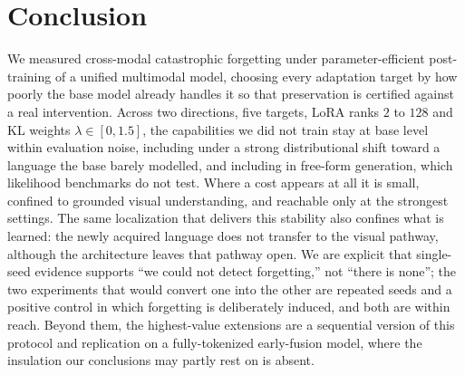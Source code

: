\documentclass{article}
\begin{document}
\section{Conclusion}
We measured cross-modal catastrophic forgetting under parameter-efficient
post-training of a unified multimodal model, choosing every adaptation target by
how poorly the base model already handles it so that preservation is certified
against a real intervention. Across two directions, five targets, LoRA ranks $2$
to $128$ and KL weights $\lambda\in[0,1.5]$, the capabilities we did not train
stay at base level within evaluation noise, including under a strong
distributional shift toward a language the base barely modelled, and including in
free-form generation, which likelihood benchmarks do not test. Where a cost
appears at all it is small, confined to grounded visual understanding, and
reachable only at the strongest settings. The same localization that delivers
this stability also confines what is learned: the newly acquired language does
not transfer to the visual pathway, although the architecture leaves that pathway
open. We are explicit that single-seed evidence supports ``we could not detect
forgetting,'' not ``there is none''; the two experiments that would convert one
into the other are repeated seeds and a positive control in which forgetting is
deliberately induced, and both are within reach. Beyond them, the highest-value
extensions are a sequential version of this protocol and replication on a
fully-tokenized early-fusion model, where the insulation our conclusions may
partly rest on is absent.



\end{document}
